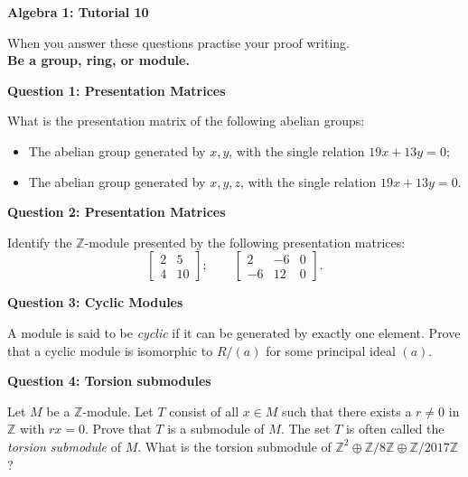 \documentclass[11pt,twoside, a4paper]{report}
\theoremstyle{plain}
\theoremstyle{definition}
\begin{document}
\begin{center}
 \noindent\makebox[\linewidth]{\rule{14cm}{1.5pt}} 
{\bf Algebra 1: Tutorial 10 }
 \noindent\makebox[\linewidth]{\rule{14cm}{1.5pt}}  
 \noindent\makebox[\linewidth]{\rule{14cm}{3pt}}
\end{center}

\noindent When you answer these questions practise your proof writing.\\
  {\bf Be a group, ring, or module.}
  
 
\begin{center}
{\bf Question 1: Presentation Matrices}
\end{center}

What is the presentation matrix of the following abelian groups:
\begin{itemize}
\item The abelian group generated by $x,y$, with the single relation $19x+13y=0$;
\item The abelian group generated by $x,y,z$, with the single relation $19x+13y=0$.
\end{itemize}


\begin{center}
{\bf Question 2: Presentation Matrices}
\end{center}

Identify the $\mathbb{Z}$-module presented by the following presentation matrices:
\[ \begin{bmatrix}
2 & 5 \\
4 & 10
\end{bmatrix};\qquad
\begin{bmatrix}
2 & -6 & 0 \\
-6 & 12 & 0
\end{bmatrix}. \]

\smallskip


\begin{center}
{\bf Question 3: Cyclic Modules}
\end{center}

A module is said to be \textit{cyclic} if it can be generated by exactly one element. Prove that a cyclic module is isomorphic to $R/(a)$ for some principal ideal $(a)$.


\begin{center}
{\bf Question 4: Torsion submodules}
\end{center}

Let $M$ be a $\mathbb{Z}$-module. Let $T$ consist of all $x\in M$ such that there exists a $r\neq0$ in $\mathbb{Z}$ with $rx=0$. Prove that $T$ is a submodule of $M$. The set $T$ is often called the \textit{torsion submodule} of $M$. What is the torsion submodule of $\mathbb{Z}^2\oplus\mathbb{Z}/8\mathbb{Z}\oplus\mathbb{Z}/2017\mathbb{Z}$?
\end{document}
